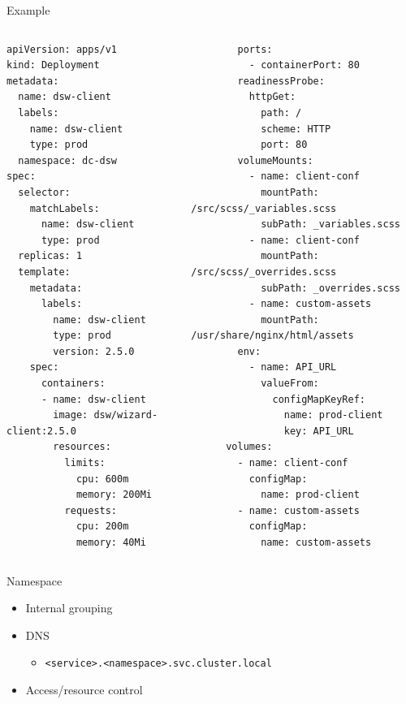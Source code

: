 \documentclass{dcpresentation}
\begin{document}
  \begin{frame}[fragile]{Example}
  \tiny
  \begin{columns}
\begin{verbatim}
apiVersion: apps/v1
kind: Deployment
metadata:
  name: dsw-client
  labels:
    name: dsw-client
    type: prod
  namespace: dc-dsw
spec:
  selector:
    matchLabels:
      name: dsw-client
      type: prod
  replicas: 1
  template:
    metadata:
      labels:
        name: dsw-client
        type: prod
        version: 2.5.0
    spec:
      containers:
      - name: dsw-client
        image: dsw/wizard-client:2.5.0
        resources:
          limits:
            cpu: 600m
            memory: 200Mi
          requests:
            cpu: 200m
            memory: 40Mi
    \end{verbatim}
  \begin{verbatim}
        ports:
          - containerPort: 80
        readinessProbe:
          httpGet:
            path: /
            scheme: HTTP
            port: 80
        volumeMounts:
          - name: client-conf
            mountPath: /src/scss/_variables.scss
            subPath: _variables.scss
          - name: client-conf
            mountPath: /src/scss/_overrides.scss
            subPath: _overrides.scss
          - name: custom-assets
            mountPath: /usr/share/nginx/html/assets
        env:
          - name: API_URL
            valueFrom:
              configMapKeyRef:
                name: prod-client
                key: API_URL
      volumes:
        - name: client-conf
          configMap:
            name: prod-client
        - name: custom-assets
          configMap:
            name: custom-assets

  \end{verbatim}
    \end{columns}

 \end{frame}
 
 \begin{frame}{Namespace}
  \begin{itemize}
   \item Internal grouping
   \item DNS
   \begin{itemize}
    \item \texttt{<service>.<namespace>.svc.cluster.local}
   \end{itemize}
   \item Access/resource control
  \end{itemize}
 \end{frame}
 
\end{document}
